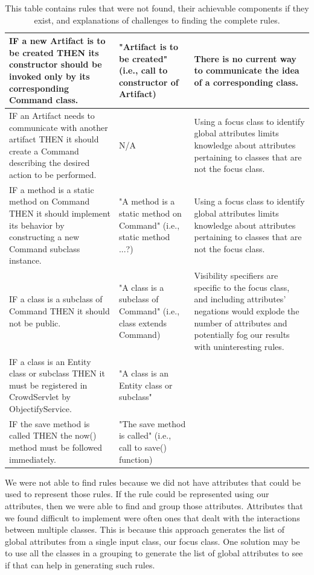 \documentclass[12pt]{article}
\begin{document}
\begin{table}[H]
\begin{tabular}{| >{\arraybackslash}m{5.5cm} | >{\arraybackslash}m{4.5cm} | >{\arraybackslash}m{5.5cm} |}
IF a new Artifact is to be created THEN its constructor should be invoked only by its corresponding Command class. & "Artifact is to be created" (i.e., call to constructor of Artifact) & There is no current way to communicate the idea of a corresponding class. \\ \hline
IF an Artifact needs to communicate with another artifact THEN it should create a Command describing the desired action to be performed. & N/A & Using a focus class to identify global attributes limits knowledge about attributes pertaining to classes that are not the focus class. \\ \hline
IF a method is a static method on Command THEN it should implement its behavior by constructing a new Command subclass instance. & "A method is a static method on Command" (i.e., static method ...?) & Using a focus class to identify global attributes limits knowledge about attributes pertaining to classes that are not the focus class. \\ \hline
IF a class is a subclass of Command THEN it should not be public. & "A class is a subclass of Command" (i.e., class extends Command) & Visibility specifiers are specific to the focus class, and including attributes' negations would explode the number of attributes and potentially fog our results with uninteresting rules. \\ \hline
IF a class is an Entity class or subclass THEN it must be registered in CrowdServlet by ObjectifyService. & "A class is an Entity class or subclass" & \\ \hline
IF the save method is called THEN the now() method must be followed immediately. & "The save method is called" (i.e., call to save() function) & \\ \hline
\end{tabular}

\caption{This table contains rules that were not found, their achievable components if they exist, and explanations of challenges to finding the complete rules.}
\end{table}		

We were not able to find rules because we did not have attributes that could be used to represent those rules. If the rule could be represented using our attributes, then we were able to find and group those attributes. Attributes that we found difficult to implement were often ones that dealt with the interactions between multiple classes. This is because this approach generates the list of global attributes from a single input class, our focus class. One solution may be to use all the classes in a grouping to generate the list of global attributes to see if that can help in generating such rules. 
\end{document}
